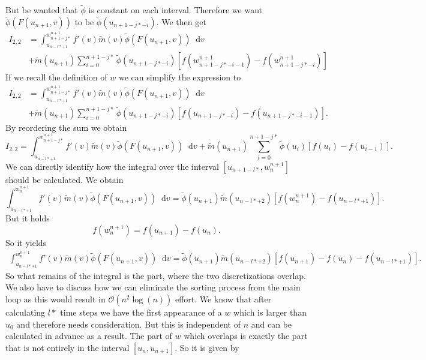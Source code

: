 \documentclass[12pt,a4paper,twoside, open=right]{scrreprt}
\theoremstyle{definition}
\theoremstyle{plain}
\newcommand{\D}{\mathop{}\!\mathrm{d}}
\begin{document}
But be wanted that $\tilde\phi$ is constant on each interval. Therefore we want $\tilde\phi(F(u_{n+1},v))$ to be $\tilde\phi(u_{n+1-j*-i})$. We then get
\begin{align}
I_{2,2}&=\int_{u_{n-l*+1}}^{w^{n+1}_{n+1-j*}}f'(v)\tilde{m}(v)\tilde{\phi}(F(u_{n+1},v))\D v \\&+\tilde{m}(u_{n+1})\sum_{i=0}^{n+1-j*}\tilde\phi(u_{n+1-j*-i})[f(w^{n+1}_{n+1-j*-i-1})-f(w_{n+1-j*-i}^{n+1})]
\end{align}
If we recall the definition of $w$ we can simplify the expression to
\begin{align}
I_{2,2}&=\int_{u_{n-l*+1}}^{w^{n+1}_{n+1-j*}}f'(v)\tilde{m}(v)\tilde{\phi}(F(u_{n+1},v))\D v \\&+\tilde{m}(u_{n+1})\sum_{i=0}^{n+1-j*}\tilde\phi(u_{n+1-j*-i})[f(u_{n+1-j*-i})-f(u_{n+1-j*-i-1})].
\end{align}
By reordering the sum we obtain
\begin{equation}
    I_{2,2}=\int_{u_{n-l*+1}}^{w^{n+1}_{n+1-j*}}f'(v)\tilde{m}(v)\tilde{\phi}(F(u_{n+1},v))\D v +
    \tilde{m}(u_{n+1})\sum_{i=0}^{n+1-j*}\tilde\phi(u_{i})[f(u_i)-f(u_{i-1})].
\end{equation}
We can directly identify how the integral over the interval $[u_{n+1-l*},w^{n+1}_{n}]$ should be calculated. We obtain 
\begin{equation}
    \int_{u_{n-l*+1}}^{w^{n+1}_n}f'(v)\tilde{m}(v)\tilde{\phi}(F(u_{n+1},v))\D v = \tilde\phi(u_{n+1})\tilde{m}(u_{n-l*+2})[f(w^{n+1}_n)-f(u_{n-l*+1})].
\end{equation}
But it holds
\begin{equation}
    f(w^{n+1}_n)=f(u_{n+1})-f(u_n).
\end{equation}
So it yields
\begin{align}
     \int_{u_{n-l*+1}}^{w^{n+1}_n}f'(v)\tilde{m}(v)\tilde{\phi}(F(u_{n+1},v))\D v = \tilde\phi(u_{n+1})\tilde{m}(u_{n-l*+2})[f(u_{n+1})-f(u_n)-f(u_{n-l*+1})].
\end{align}
So what remains of the integral is the part, where the two discretizations overlap. We also have to discuss how we can eliminate the sorting process from the main loop as this would result in $\mathcal{O}(n^2\log(n))$ effort. We know that after calculating $l*$ time steps we have the first appearance of a $w$ which is larger than $u_0$ and therefore needs consideration. But this is independent of $n$ and can be calculated in advance as a result. The part of $w$ which overlaps is exactly the part that is not entirely in the interval $[u_n,u_{n+1}]$. So it is given by
\end{document}
